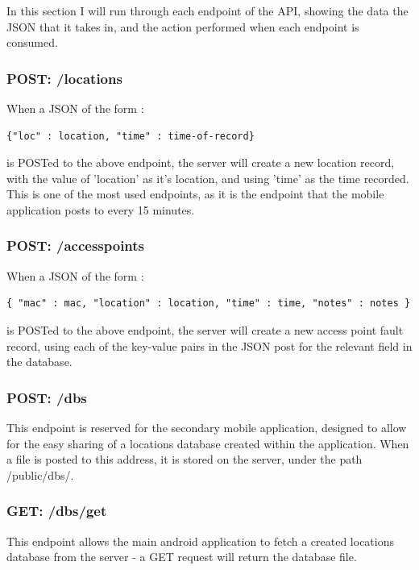 \documentclass[11pt]{informatics-report}
\begin{document}
In this section I will run through each endpoint of the API, showing the data the JSON that it takes in, and the action performed when each endpoint is consumed.

\subsubsection{POST: /locations}

When a JSON of the form :

\begin{verbatim}
{"loc" : location, "time" : time-of-record}
\end{verbatim}

is POSTed to the above endpoint, the server will create a new location record, with the value of 'location' as it's location, and using 'time' as the time recorded. This is one of the most used endpoints, as it is the endpoint that the mobile application posts to every 15 minutes.

\subsubsection{POST: /accesspoints}

When a JSON of the form :

\begin{verbatim}
{ "mac" : mac, "location" : location, "time" : time, "notes" : notes }
\end{verbatim}
is POSTed to the above endpoint, the server will create a new access point fault record, using each of the key-value pairs in the JSON post for the relevant field in the database.

\subsubsection{POST: /dbs}

This endpoint is reserved for the secondary mobile application, designed to allow for the easy sharing of a locations database created within the application. When a file is posted to this address, it is stored on the server, under the path /public/dbs/.

\subsubsection{GET: /dbs/get}

This endpoint allows the main android application to fetch a created locations database from the server - a GET request will return the database file.
\end{document}
